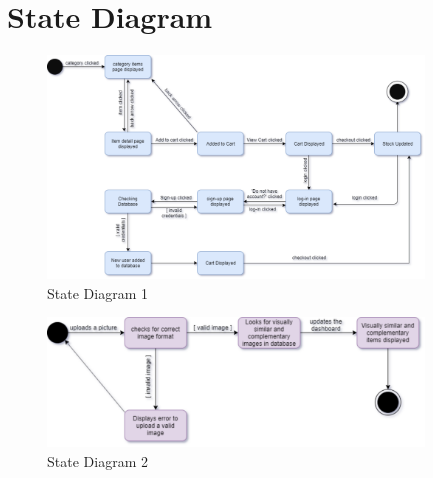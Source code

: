 %

\section{State Diagram}

\begin{figure}[H]
\includegraphics[width=10cm]{images/StateDiag1.pdf} 
\centering
\caption{State Diagram 1}
\label{state: one}
\end{figure}

\begin{figure}[H]
\includegraphics[width=10cm]{images/StateDiag2.pdf} 
\centering
\caption{State Diagram 2}
\label{state: two}
\end{figure}

